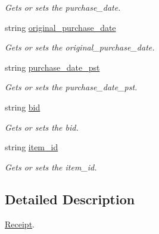 \begin{DoxyCompactItemize}
\begin{DoxyCompactList}\small\item\em Gets or sets the purchase\+\_\+date. \end{DoxyCompactList}\item 
string \mbox{\hyperlink{class_t_net_1_1_contract_1_1_action_1_1_app_store_pay_action_1_1_receipt_a2c06197cbb494b18bb3c5679b6a0645f}{original\+\_\+purchase\+\_\+date}}
\begin{DoxyCompactList}\small\item\em Gets or sets the original\+\_\+purchase\+\_\+date. \end{DoxyCompactList}\item 
string \mbox{\hyperlink{class_t_net_1_1_contract_1_1_action_1_1_app_store_pay_action_1_1_receipt_aed30c3e798225f7bbac3e3f23188adb6}{purchase\+\_\+date\+\_\+pst}}
\begin{DoxyCompactList}\small\item\em Gets or sets the purchase\+\_\+date\+\_\+pst. \end{DoxyCompactList}\item 
string \mbox{\hyperlink{class_t_net_1_1_contract_1_1_action_1_1_app_store_pay_action_1_1_receipt_a516a5ac3d30ea97ac73503e711786d25}{bid}}
\begin{DoxyCompactList}\small\item\em Gets or sets the bid. \end{DoxyCompactList}\item 
string \mbox{\hyperlink{class_t_net_1_1_contract_1_1_action_1_1_app_store_pay_action_1_1_receipt_a071f24cc4d59aabc8f81e8e7fa9539e3}{item\+\_\+id}}
\begin{DoxyCompactList}\small\item\em Gets or sets the item\+\_\+id. \end{DoxyCompactList}\end{DoxyCompactItemize}


\subsection{Detailed Description}
\mbox{\hyperlink{class_t_net_1_1_contract_1_1_action_1_1_app_store_pay_action_1_1_receipt}{Receipt}}. 



